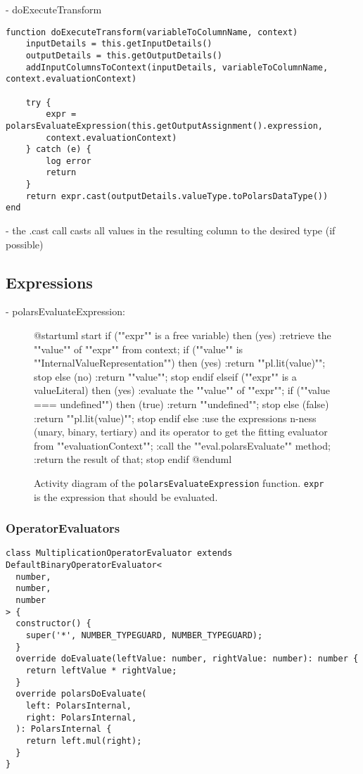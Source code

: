 - doExecuteTransform
\begin{listing}
	\begin{verbatim}
function doExecuteTransform(variableToColumnName, context)
	inputDetails = this.getInputDetails()
	outputDetails = this.getOutputDetails()
	addInputColumnsToContext(inputDetails, variableToColumnName, context.evaluationContext)

	try {
		expr = polarsEvaluateExpression(this.getOutputAssignment().expression,
		context.evaluationContext)
	} catch (e) {
		log error
		return
	}
	return expr.cast(outputDetails.valueType.toPolarsDataType())
end
	\end{verbatim}
\end{listing}
- the .cast call casts all values in the resulting column to the desired type (if possible)

\subsection{Expressions}
- polarsEvaluateExpression:
\begin{figure}
	\begin{plantuml}
		@startuml
		start
		if (""expr"" is a free variable) then (yes)
		:retrieve the ""value"" of ""expr"" from context;
		if (""value"" is ""InternalValueRepresentation"") then (yes)
		:return ""pl.lit(value)"";
		stop
		else (no)
		:return ""value"";
		stop
		endif
		elseif (""expr"" is a valueLiteral) then (yes)
		:evaluate the ""value"" of ""expr"";
		if (""value === undefined"") then (true)
		:return ""undefined"";
		stop
		else (false)
		:return ""pl.lit(value)"";
		stop
		endif
		else
		:use the expressions n-ness (unary, binary, tertiary) and its
		operator to get the fitting evaluator from ""evaluationContext"";
		:call the ""eval.polarsEvaluate"" method;
		:return the result of that;
		stop
		endif
		@enduml
	\end{plantuml}
	\caption{
		Activity diagram of the \Verb|polarsEvaluateExpression| function.
		\Verb|expr| is the expression that should be evaluated. %
	}
	\label{fig:uml:polars_evaluate_expression}
\end{figure}


\subsubsection{OperatorEvaluators}
\begin{listing}
	\begin{verbatim}
class MultiplicationOperatorEvaluator extends DefaultBinaryOperatorEvaluator<
  number,
  number,
  number
> {
  constructor() {
    super('*', NUMBER_TYPEGUARD, NUMBER_TYPEGUARD);
  }
  override doEvaluate(leftValue: number, rightValue: number): number {
    return leftValue * rightValue;
  }
  override polarsDoEvaluate(
    left: PolarsInternal,
    right: PolarsInternal,
  ): PolarsInternal {
    return left.mul(right);
  }
}
	\end{verbatim}

\end{listing}





